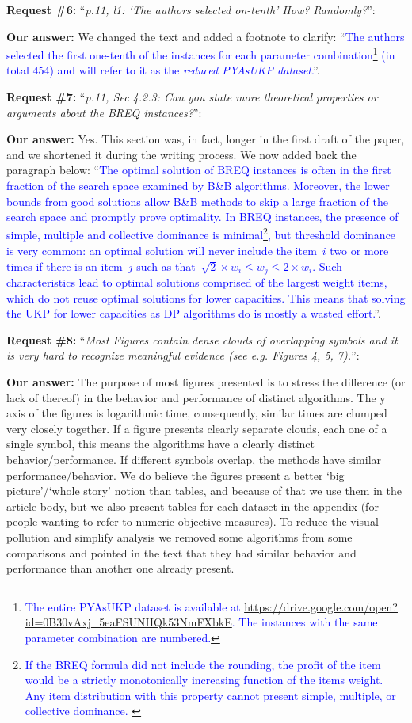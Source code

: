\documentclass{elsarticle}
\begin{document}
\textbf{Request \#6:} ``\textit{p.11, l1: `The authors selected on-tenth' How? Randomly?}'':

\textbf{Our answer: } We changed the text and added a footnote to clarify: ``\textcolor{blue}{The authors selected the first one-tenth of the instances for each parameter combination\footnote{\textcolor{blue}{The entire PYAsUKP dataset is available at \url{https://drive.google.com/open?id=0B30vAxj_5eaFSUNHQk53NmFXbkE}. The instances with the same parameter combination are numbered.}} (in total 454) and will refer to it as the \emph{reduced PYAsUKP dataset}.}''.
\medskip

\textbf{Request \#7:} ``\textit{p.11, Sec 4.2.3: Can you state more theoretical properties or arguments about the BREQ instances?}'':

\textbf{Our answer:}
Yes.
This section was, in fact, longer in the first draft of the paper, and we shortened it during the writing process.
We now added back the paragraph below:
``\textcolor{blue}{The optimal solution of BREQ instances is often in the first fraction of the search space examined by B\&B algorithms. Moreover, the lower bounds from good solutions allow B\&B methods to skip a large fraction of the search space and promptly prove optimality. In BREQ instances, the presence of simple, multiple and collective dominance is minimal\footnote{\textcolor{blue}{
If the BREQ formula did not include the rounding, the profit of the item would be a strictly monotonically increasing function of the items weight.
Any item distribution with this property cannot present simple, multiple, or collective dominance.
}}, but threshold dominance is very common: an optimal solution will never include the item~\(i\) two or more times if there is an item~\(j\) such as that~\(\sqrt{2} \times w_i \leq w_j \leq 2 \times w_i\).
Such characteristics lead to optimal solutions comprised of the largest weight items, which do not reuse optimal solutions for lower capacities.
This means that solving the UKP for lower capacities as DP algorithms do is mostly a wasted effort.}''.
\medskip

\textbf{Request \#8:} ``\textit{Most Figures contain dense clouds of overlapping symbols and it is very hard to recognize meaningful evidence (see e.g. Figures 4, 5, 7).}'':

\textbf{Our answer:} The purpose of most figures presented is to stress the difference (or lack of thereof) in the behavior and performance of distinct algorithms. The y axis of the figures is logarithmic time, consequently, similar times are clumped very closely together. If a figure presents clearly separate clouds, each one of a single symbol, this means the algorithms have a clearly distinct behavior/performance. If different symbols overlap, the methods have similar performance/behavior. We do believe the figures present a better `big picture'/`whole story' notion than tables, and because of that we use them in the article body, but we also present tables for each dataset in the appendix (for people wanting to refer to numeric objective measures). To reduce the visual pollution and simplify analysis we removed some algorithms from some comparisons and pointed in the text that they had similar behavior and performance than another one already present.
\medskip
\end{document}
